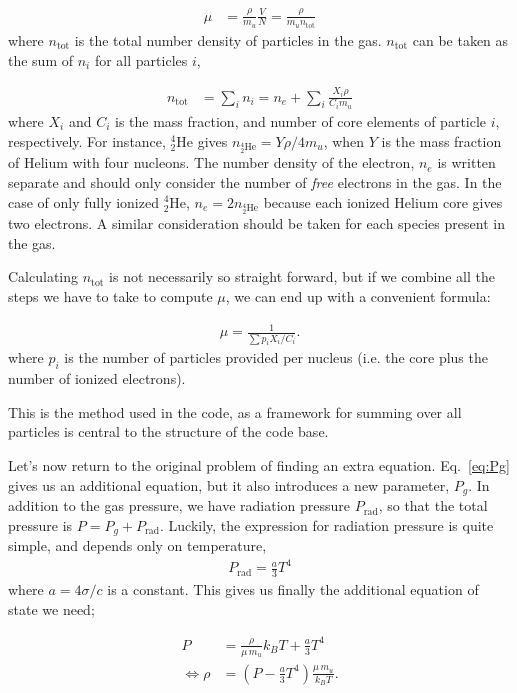 \documentclass[11pt,twocolumn]{article}
\begin{document}
\begin{align}
  \mu &= \frac{\rho}{m_u}\frac{V }{ N } = \frac{ \rho }{ m_un_\text{tot} }
\end{align}
where $n_\text{tot}$ is the total number density of particles in the
gas. $n_\text{tot}$ can be taken as the sum of $n_i$ for all particles
$i$,

\begin{align}
  n_\text{tot} &= \sum_i n_i = n_e+ \sum_i \frac{ X_i\rho }{ C_i m_u}
\end{align}
where $X_i$ and $C_i$ is the mass fraction, and number of core
elements of particle $i$, respectively. For instance, $^4_2\text{He}$
gives $n_{^4_2\text{He}} = Y\rho/4m_u$, when $Y$ is the mass fraction
of Helium with four nucleons. The number density of the
electron, $n_e$ is written separate and should only consider the
number of \emph{free} electrons in the gas. In the case of only fully
ionized $^4_2\text{He}$, $n_e = 2n_{^4_2\text{He}}$ because each
ionized Helium core gives two electrons. A similar consideration
should be taken for each species present in the gas. 

Calculating $n_\text{tot}$ is not necessarily so straight forward, but
if we combine all the steps we have to take to compute $\mu$, we can
end up with a convenient formula:

\begin{align}
  \mu = \frac{1}{\sum p_iX_i/C_i}\label{eq:mu_0}.
\end{align}
where $p_i$ is the number of particles provided per nucleus (i.e. the
core plus the number of ionized electrons).

This is the method used in the code, as a framework for summing over
all particles is central to the structure of the code base.


Let's now return to the original problem of finding an extra
equation. Eq.~\eqref{eq:Pg} gives us an additional equation, but it
also introduces a new parameter, $P_g$. In addition to the gas
pressure, we have radiation pressure $P_{\text{rad}}$, so that the
total pressure is $P = P_g + P_\text{rad}$. Luckily, the expression
for radiation pressure is quite simple, and depends only on
temperature,
\begin{align}
  P_\text{rad} = \frac{ a }{ 3 }T^4
\end{align}
where $a = 4\sigma/c$ is a constant. This gives us finally the
additional equation of state we need;

\begin{align}
  P &= \frac{ \rho }{ \mu\,m_u }k_B T + \frac{ a }{ 3 }T^4\label{eq:P-eq_state}\\
  \Leftrightarrow \rho &= (P - \frac{a}{3}T^4) \frac{ \mu\,m_u }{ k_BT }\label{eq:rho-eq_state}.
\end{align}
\end{document}
